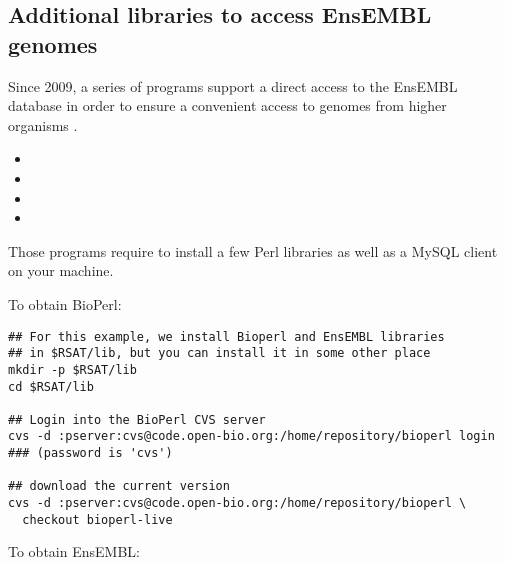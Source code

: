 \documentclass{book}
\begin{document}


\subsection{Additional libraries to access EnsEMBL genomes}

Since 2009, a series of \RSAT programs support a direct access to the
EnsEMBL database in order to ensure a convenient access to genomes
from higher organisms \cite{Sand:2009}.

\begin{itemize}
\item {}
\item {}
\item {} 
\item {}
\end{itemize}

Those programs require to install a few Perl libraries as well as a
MySQL client on your machine. 

To obtain BioPerl:

\begin{footnotesize}
\begin{verbatim}
## For this example, we install Bioperl and EnsEMBL libraries 
## in $RSAT/lib, but you can install it in some other place
mkdir -p $RSAT/lib
cd $RSAT/lib

## Login into the BioPerl CVS server
cvs -d :pserver:cvs@code.open-bio.org:/home/repository/bioperl login
### (password is 'cvs')

## download the current version
cvs -d :pserver:cvs@code.open-bio.org:/home/repository/bioperl \
  checkout bioperl-live

\end{verbatim}
\end{footnotesize}


To obtain EnsEMBL:
\end{document}
